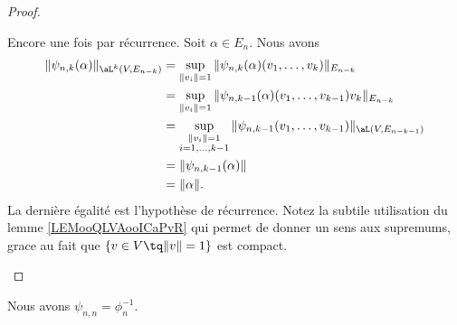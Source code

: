 \begin{proof}
\begin{subproof}
		\spitem[Isométrique]
		Encore une fois par récurrence. Soit \( \alpha\in E_n\). Nous avons
		\begin{subequations}
			\begin{align}
				\| \psi_{n,k}(\alpha) \|_{\aL^k(V,E_{n-k})} & =\sup_{\| v_i \|=1}\| \psi_{n,k}(\alpha)(v_1,\ldots, v_k) \|_{E_{n-k}}          \\
				                                            & =\sup_{\| v_i \|=1}\| \psi_{n,k-1}(\alpha)(v_1,\ldots, v_{k-1})v_k \|_{E_{n-k}} \\
				                                            & =\sup_{\substack{\| v_i \|=1                                                    \\i=1,\ldots, k-1}}\| \psi_{n,k-1}(v_1,\ldots, v_{k-1}) \|_{\aL(V,E_{n-k-1})}\\
				                                            & =\| \psi_{n,k-1}(\alpha) \|                                                     \\
				                                            & =\| \alpha \|.
			\end{align}
		\end{subequations}
		La dernière égalité est l'hypothèse de récurrence. Notez la subtile utilisation du lemme \ref{LEMooQLVAooICaPvR} qui permet de donner un sens aux supremums, grace au fait que \( \{ v\in V\tq \| v \|=1 \}\) est compact.
	\end{subproof}
\end{proof}

\begin{lemma}       \label{LEMooFBEGooCqrzxH}
	Nous avons \( \psi_{n,n}=\phi_n^{-1}\).
\end{lemma}

